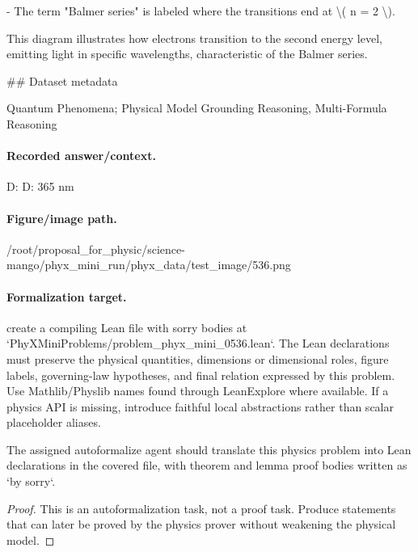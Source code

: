 - The term "Balmer series" is labeled where the transitions end at \textbackslash{}( n = 2 \textbackslash{}).

This diagram illustrates how electrons transition to the second energy level, emitting light in specific wavelengths, characteristic of the Balmer series.

\#\# Dataset metadata

Quantum Phenomena; Physical Model Grounding Reasoning, Multi-Formula Reasoning

\paragraph{Recorded answer/context.}
D: D: 365 nm

\paragraph{Figure/image path.}
/root/proposal\_for\_physic/science-mango/phyx\_mini\_run/phyx\_data/test\_image/536.png

\paragraph{Formalization target.}
create a compiling Lean file with sorry bodies at `PhyXMiniProblems/problem\_phyx\_mini\_0536.lean`. The Lean declarations must preserve the physical quantities, dimensions or dimensional roles, figure labels, governing-law hypotheses, and final relation expressed by this problem.
Use Mathlib/Physlib names found through LeanExplore where available. If a physics API is missing, introduce faithful local abstractions rather than scalar placeholder aliases.

\begin{theorem}
\label{thm:physics:phyx_mini_0536:target}
The assigned autoformalize agent should translate this physics problem into Lean declarations in the covered file, with theorem and lemma proof bodies written as `by sorry`.
\end{theorem}
\begin{proof}
This is an autoformalization task, not a proof task. Produce statements that can later be proved by the physics prover without weakening the physical model.
\end{proof}


